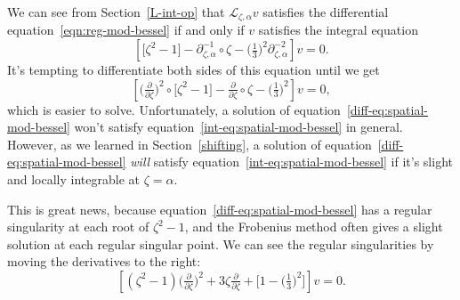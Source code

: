 \documentclass{article}
\theoremstyle{plain}
\newcommand{\laplace}{\mathcal{L}}
\newcommand{\fracderiv}[3]{\partial^{#1}_{#2, #3}}
\begin{document}
We can see from Section~\ref{L-int-op} that $\laplace_{\zeta, \alpha} v$ satisfies the differential equation~\ref{eqn:reg-mod-bessel} if and only if $v$ satisfies the integral equation
\begin{equation}\label{int-eq:spatial-mod-bessel}
\left[ \big[ \zeta^2 - 1 \big] - \fracderiv{-1}{\zeta}{\alpha} \circ \zeta - \big(\tfrac{1}{3}\big)^2 \fracderiv{-2}{\zeta}{\alpha} \right] v = 0.
\end{equation}
It's tempting to differentiate both sides of this equation until we get
\begin{equation}\label{diff-eq:spatial-mod-bessel}
\left[ \big(\tfrac{\partial}{\partial \zeta}\big)^2 \circ \big[ \zeta^2 - 1 \big] - \tfrac{\partial}{\partial \zeta} \circ \zeta - \big(\tfrac{1}{3}\big)^2 \right] v = 0,
\end{equation}
which is easier to solve. Unfortunately, a solution of equation~\ref{diff-eq:spatial-mod-bessel} won't satisfy equation~\ref{int-eq:spatial-mod-bessel} in general. However, as we learned in Section~\ref{shifting}, a solution of equation~\ref{diff-eq:spatial-mod-bessel} {\em will} satisfy equation~\ref{int-eq:spatial-mod-bessel} if it's slight and locally integrable at $\zeta = \alpha$.

This is great news, because equation~\ref{diff-eq:spatial-mod-bessel} has a regular singularity at each root of $\zeta^2 - 1$, and the Frobenius method often gives a slight solution at each regular singular point. We can see the regular singularities by moving the derivatives to the right:
\[ \left[ (\zeta^2 - 1) \big(\tfrac{\partial}{\partial \zeta}\big)^2 + 3\zeta \tfrac{\partial}{\partial \zeta} + \big[ 1 - \big(\tfrac{1}{3}\big)^2 \big] \right] v = 0. \]
\end{document}
